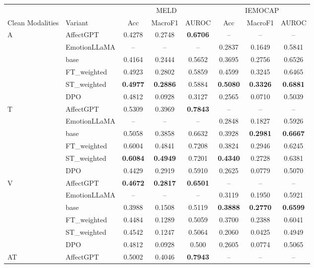 \begin{table}[t]
\centering
\small
\begin{tabular}{llcccccc}
\toprule
& & \multicolumn{3}{c}{MELD} & \multicolumn{3}{c}{IEMOCAP} \\
\cmidrule(lr){3-5} \cmidrule(lr){6-8}
Clean Modalities & Variant & Acc & MacroF1 & AUROC  & Acc & MacroF1 & AUROC \\
\midrule
\multirow{3}{*}{A}
& AffectGPT & 0.4278 & 0.2748 & \textbf{0.6706} & -- & -- & --\\
& EmotionLLaMA & -- & -- & -- & 0.2837 & 0.1649 & 0.5841 \\
& base & 0.4164 & 0.2444 &  0.5652 &  0.3695 & 0.2756 & 0.6526 \\
& FT\_weighted & 0.4923 & 0.2802 &  0.5859 & 0.4599 & 0.3245 & 0.6465 \\
& ST\_weighted & \textbf{0.4977} & \textbf{0.2886} & 0.5884 & \textbf{0.5080} & \textbf{0.3326} & \textbf{0.6881} \\
& DPO & 0.4812 & 0.0928 & 0.3127 & 0.2565 & 0.0710 & 0.5039 \\
\midrule
\multirow{3}{*}{T}
& AffectGPT & 0.5309 & 0.3969 & \textbf{0.7843} & -- & -- & -- \\
& EmotionLLaMA & -- & -- & -- & 0.2848 & 0.1827 & 0.5926\\
& base & 0.5058 & 0.3858 & 0.6632 & 0.3928 & \textbf{0.2981} & \textbf{0.6667} \\
& FT\_weighted & 0.6004 & 0.4841 & 0.7208 & 0.3824 & 0.2946 & 0.6245 \\
& ST\_weighted & \textbf{0.6084} & \textbf{0.4949} & 0.7201 & \textbf{0.4340} & 0.2728 & 0.6381 \\
& DPO & 0.4429 & 0.2919 & 0.5910 & 0.2625 & 0.0779 & 0.5070 \\
\midrule
\multirow{3}{*}{V}
& AffectGPT & \textbf{0.4672} & \textbf{0.2817} & \textbf{0.6501} & -- & -- & --\\
& EmotionLLaMA & -- & -- & -- & 0.3119 & 0.1950 & 0.5921 \\
& base & 0.3988 & 0.1508 & 0.5119 & \textbf{0.3888} & \textbf{0.2770} & \textbf{0.6599} \\
& FT\_weighted & 0.4484 & 0.1289 &  0.5059 & 0.3700 & 0.2388 & 0.6041 \\
& ST\_weighted & 0.4542 & 0.1247 & 0.5064 & 0.2060 & 0.0425 & 0.4949\\
& DPO & 0.4812 & 0.0928 & 0.500 & 0.2605 & 0.0774 & 0.5065 \\
\midrule
\multirow{3}{*}{AT}
& AffectGPT & 0.5002 & 0.4046 & \textbf{0.7943} & -- & -- & --\\

\end{tabular}
\end{table}
